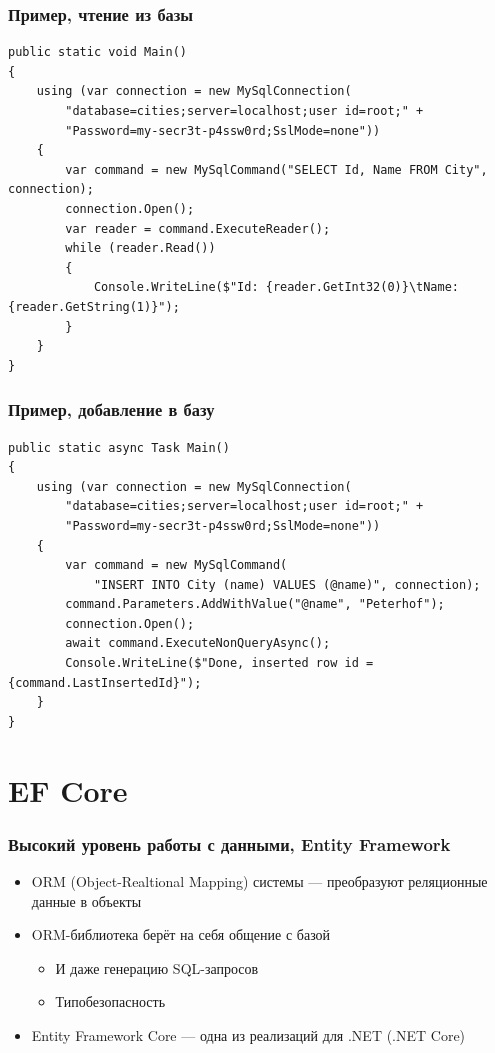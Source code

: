 \documentclass[xetex,mathserif,serif]{beamer}
\begin{document}
	\begin{frame}[fragile]
		\frametitle{Пример, чтение из базы}
		\begin{footnotesize}
			\begin{verbatim}
public static void Main()
{
    using (var connection = new MySqlConnection(
        "database=cities;server=localhost;user id=root;" + 
        "Password=my-secr3t-p4ssw0rd;SslMode=none"))
    {
        var command = new MySqlCommand("SELECT Id, Name FROM City", connection);
        connection.Open();
        var reader = command.ExecuteReader();
        while (reader.Read())
        {
            Console.WriteLine($"Id: {reader.GetInt32(0)}\tName:{reader.GetString(1)}");
        }
    }
}
			\end{verbatim}
		\end{footnotesize}
	\end{frame}

	\begin{frame}[fragile]
		\frametitle{Пример, добавление в базу}
		\begin{footnotesize}
			\begin{verbatim}
public static async Task Main()
{
    using (var connection = new MySqlConnection(
        "database=cities;server=localhost;user id=root;" +
        "Password=my-secr3t-p4ssw0rd;SslMode=none"))
    {
        var command = new MySqlCommand(
            "INSERT INTO City (name) VALUES (@name)", connection);
        command.Parameters.AddWithValue("@name", "Peterhof");
        connection.Open();
        await command.ExecuteNonQueryAsync();
        Console.WriteLine($"Done, inserted row id = {command.LastInsertedId}");
    }
}
			\end{verbatim}
		\end{footnotesize}
	\end{frame}

	\section{EF Core}

	\begin{frame}
		\frametitle{Высокий уровень работы с данными, Entity Framework}
		\begin{itemize}
			\item ORM (Object-Realtional Mapping) системы --- преобразуют реляционные данные в объекты
			\item ORM-библиотека берёт на себя общение с базой
			\begin{itemize}
				\item И даже генерацию SQL-запросов
				\item Типобезопасность
			\end{itemize}
			\item Entity Framework Core --- одна из реализаций для .NET (.NET Core)
		\end{itemize}
	\end{frame}
\end{document}
